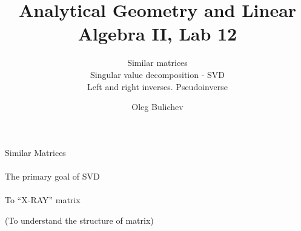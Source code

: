 \documentclass[aspectratio=169]{beamer}
\title[AGLA2]{Analytical Geometry and Linear Algebra II, Lab 12} %
\subtitle{Similar matrices \\ Singular value decomposition - SVD \\ Left and right inverses. Pseudoinverse
         } %
\author{Oleg Bulichev}
\newcommand{\fbckg}[1]{\usebackgroundtemplate{\texttt{[image: \#1]}}}%
\begin{document}
\setlength{\abovedisplayskip}{0pt}
\setlength{\belowdisplayskip}{0pt}
\setlength{\abovedisplayshortskip}{0pt}
\setlength{\belowdisplayshortskip}{0pt}

\fbckg{fibeamer/figs/title_page.png}

\fbckg{fibeamer/figs/common.png}


\begin{frame}[t]{Similar Matrices}
\framesubtitle{}
    
\end{frame}

\begin{frame}[c]{The primary goal of SVD}
\framesubtitle{}
\centering\LARGE
To “X-RAY” matrix

(To understand the structure of matrix)
\end{frame}
\end{document}
